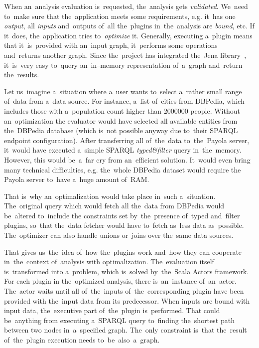 When an~analysis evaluation is~requested, the~analysis gets \emph{validated}. We~need to~make
sure that the~application meets some requirements, e.g. it~has one 
\emph{output}, all \emph{inputs} and~outputs of~all the~plugins in~the~analysis are \emph{bound}, etc.
If it~does, the~application tries to~\emph{optimize} it. Generally, executing a~plugin 
means that it~is~provided with an~input graph, it~performs some operations and~returns another graph. Since the~project has integrated the~Jena library~\cite{jena}, it~is~very easy to~query an~in--memory representation of~a~graph and~return the~results.

Let us~imagine a~situation where a~user wants to~select a~rather small range of~data from a~data source. For instance, a~list of~cities from DBPedia, which includes those
with a~population count higher than $2000000$ people. Without an~optimization
the evaluator would have selected all available entities from the~DBPedia 
database (which is~not possible anyway due to~their SPARQL endpoint 
configuration). After transferring all of~the~data to~the~Payola server, it~would have
executed a~simple SPARQL \emph{typed\&filter} query in~the~memory.
However, this would be~a~far cry from an~efficient solution. It~would even
bring many technical difficulties, e.g. the~whole DBPedia dataset would require 
the Payola server to~have a~huge amount of~RAM.

That is~why an~optimalization would take place in~such a~situation. The~original 
query which would fetch all the~data from DBPedia would be~altered to~include 
the constraints set by~the~presence of~typed and~filter plugins, so~that the~data fetcher would have to~fetch as~less data as~possible. The~optimizer can 
also handle unions or~joins over the~same data sources.

That gives us~the~idea of~how the~plugins work and~how they can cooperate in~the~context of~analysis with optimalization. The~evaluation itself is~transformed 
into a~problem, which is~solved by~the~Scala Actors framework. For each plugin 
in the~optimized analysis, there is~an~instance of~an~actor. The~actor waits 
until all of~the~inputs of~the~corresponding plugin have been provided with the~input data from its predecessor. When inputs are bound with input data, the~executive part of~the~plugin is~performed. That could be~anything from 
executing a~SPARQL query to~finding the~shortest path between two nodes in~a~specified graph. The~only constraint is~that the~result of~the~plugin execution 
needs to~be~also~a~graph.

